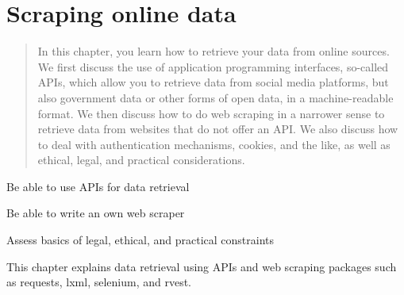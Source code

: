 \chapter{Scraping online data}
\label{chap:scraping}

\begin{abstract}
In this chapter, you learn how to retrieve your data from online sources. We first discuss the use of application programming interfaces, so-called APIs, which allow you to retrieve data from social media platforms, but also government data or other forms of open data, in a machine-readable format. We then discuss how to do web scraping in a narrower sense to retrieve data from websites that do not offer an API. We also discuss how to deal with authentication mechanisms, cookies, and the like, as well as ethical, legal, and practical considerations.
\end{abstract}



\begin{objectives}
\item Be able to use APIs for data retrieval
\item Be able to write an own web scraper
\item Assess basics of legal, ethical, and practical constraints
\end{objectives}

\begin{feature}
This chapter explains data retrieval using APIs and web scraping packages such as requests, lxml, selenium, and rvest.
\end{feature}










